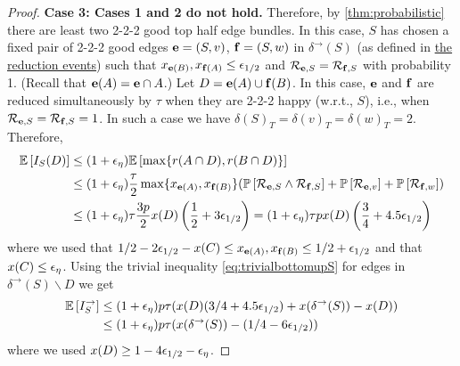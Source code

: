 \begin{proof}
{\bf Case 3: Cases 1 and 2 do not hold.} Therefore, by \cref{thm:probabilistic} there are least two 2-2-2 good top half edge bundles. In this case, $S$ has chosen a fixed pair of 2-2-2 good edges ${\bf e}= (S,v)$, ${\bf f} = (S,w)$ in $\delta ^\rightarrow(S)$ (as defined in \hyperlink{reduction-events}{the reduction events}) such that $x_{{\bf e}(B)},x_{{\bf f}(A)}\leq {\epsilon}_{1/2}$ and ${\mathcal{R}}_{{\bf e},S}={\mathcal{R}}_{{\bf f},S}$ with probability 1. 
(Recall that ${\bf e}(A)={\bf e}\cap A$.) Let $D={\bf e}(A) \cup {\bf f}(B)$. 
In this case, ${\bf e}$ and ${\bf f}$ are reduced simultaneously by $\tau$ when they are 2-2-2 happy (w.r.t., $S$), i.e., when ${\mathcal{R}}_{{\bf e},S}={\mathcal{R}}_{{\bf f},S}=1$. In such a case we have $\delta(S)_T = \delta(v)_T = \delta(w)_T = 2$. 
Therefore,
\begin{align*}{\mathbb{E}}\left[I_S(D)\right] &\leq  (1+{\epsilon}_\eta) {\mathbb{E}}\left[\max\{r(A\cap D), r(B\cap D)\}\right] \\
&\leq (1+{\epsilon}_\eta) \frac{\tau}{2} \max\{x_{{\bf e}(A)},x_{{\bf f}(B)}\} ({\mathbb{P}}\left[{\mathcal{R}}_{{\bf e},S} \land {\mathcal{R}}_{{\bf f},S}\right] + {\mathbb{P}}\left[{\mathcal{R}}_{{\bf e},v}\right] + {\mathbb{P}}\left[{\mathcal{R}}_{{\bf f},w}\right]) \\
&\leq (1+{\epsilon}_\eta) \tau \frac{3p}{2} x(D)\left(\frac12+3{\epsilon}_{1/2}\right) = (1+{\epsilon}_\eta) \tau p x(D)\left(\frac34+4.5{\epsilon}_{1/2}\right)
\end{align*}
where we used that $1/2-2{\epsilon}_{1/2}-x(C)\leq x_{{\bf e}(A)},x_{{\bf f}(B)} \leq 1/2+{\epsilon}_{1/2}$ and that $x(C)\leq {\epsilon}_{\eta}$.
Using the trivial inequality \cref{eq:trivialbottomupS} for edges in $\delta^\rightarrow(S)\smallsetminus D$ we get
\begin{align*} {\mathbb{E}}\left[I^\rightarrow_S\right] &\leq (1+{\epsilon}_\eta) p\tau (x(D)(3/4+4.5{\epsilon}_{1/2})+x(\delta^\rightarrow(S))-x(D)) \\
&	\leq (1+{\epsilon}_\eta)p\tau (x(\delta^\rightarrow(S))-(1/4-6{\epsilon}_{1/2}))
\end{align*}
where we used $x(D)\geq 1-4{\epsilon}_{1/2}-{\epsilon}_\eta$.






\end{proof}
